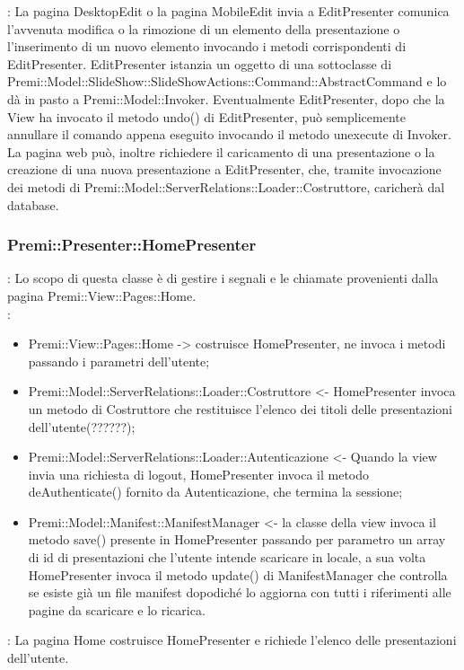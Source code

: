 {{\begin{itemize}
		\end{itemize} 
		\textbf{\interfacce}: La pagina DesktopEdit o la pagina MobileEdit invia a EditPresenter comunica l’avvenuta modifica o la rimozione di un elemento della presentazione o l’inserimento di un nuovo elemento invocando i metodi corrispondenti di EditPresenter. EditPresenter istanzia un oggetto di una sottoclasse di Premi::Model::SlideShow::SlideShowActions::Command::AbstractCommand e lo dà in pasto a Premi::Model::Invoker. Eventualmente EditPresenter, dopo che la View ha invocato il metodo undo() di EditPresenter, può semplicemente annullare il comando appena eseguito invocando il metodo unexecute di Invoker.
		La pagina web può, inoltre richiedere il caricamento di una presentazione o la creazione di una nuova presentazione a EditPresenter, che, tramite invocazione dei metodi di Premi::Model::ServerRelations::Loader::Costruttore, caricherà dal database.
		\\
	}
	\subsubsection{Premi::Presenter::HomePresenter}{
				\textbf{\tipo}: Lo scopo di questa classe è di gestire i segnali e le chiamate provenienti dalla pagina Premi::View::Pages::Home.\\	
				\textbf{\relaz}:
				\begin{itemize}
					\item Premi::View::Pages::Home -> costruisce HomePresenter, ne invoca i metodi passando i parametri dell’utente;
					\item Premi::Model::ServerRelations::Loader::Costruttore <- HomePresenter invoca un metodo di Costruttore che restituisce l’elenco dei titoli delle presentazioni dell’utente(??????);
					\item Premi::Model::ServerRelations::Loader::Autenticazione <- Quando la view invia una richiesta di logout, HomePresenter invoca il metodo deAuthenticate() fornito da Autenticazione, che termina la sessione;
					\item Premi::Model::Manifest::ManifestManager <- la classe della view invoca il metodo save() presente in  HomePresenter passando per parametro un array di id di presentazioni che l'utente intende scaricare in locale, a sua volta HomePresenter invoca il metodo update() di ManifestManager che controlla se esiste già un file manifest dopodiché lo aggiorna con tutti i riferimenti alle pagine da scaricare e lo ricarica. 					
				\end{itemize} 
				\textbf{\interfacce}: La pagina Home costruisce HomePresenter e richiede l’elenco delle presentazioni dell’utente.\\
			}
}
